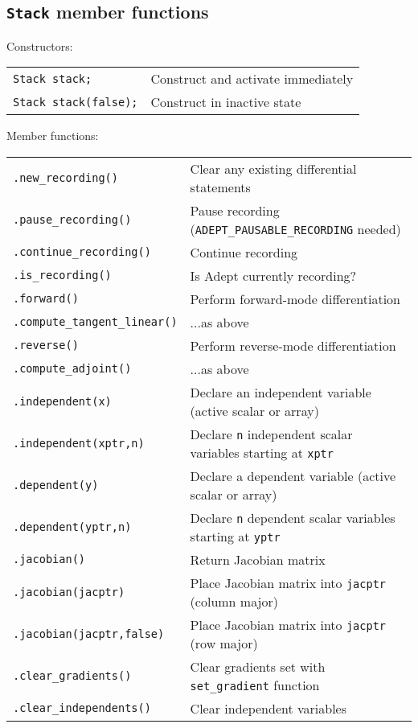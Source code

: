 \documentclass[10pt,a4,landscape]{article}
\def\code#1{\texttt{#1}}
\begin{document}
\subsection*{\code{Stack} member functions}
Constructors:\\
\begin{tabular}{ll}
\code{Stack stack;} & Construct and activate immediately \\
\code{Stack stack(false);} & Construct in inactive state\\
\end{tabular}

Member functions:\\
\begin{tabular}{ll}
\code{.new\_recording()} & Clear any existing differential statements\\
\code{.pause\_recording()} & Pause recording (\code{ADEPT\_PAUSABLE\_RECORDING} needed)\\
\code{.continue\_recording()} & Continue recording \\
\code{.is\_recording()} & Is Adept currently recording?\\
\code{.forward()} & Perform forward-mode differentiation\\
\code{.compute\_tangent\_linear()} & ...as above\\
\code{.reverse()} & Perform reverse-mode differentiation\\
\code{.compute\_adjoint()} & ...as above\\
\code{.independent(x)} & Declare an independent variable (active scalar or array)\\
\code{.independent(xptr,n)} & Declare \code{n} independent scalar variables starting at \code{xptr} \\
\code{.dependent(y)} & Declare a dependent variable (active scalar or array)\\
\code{.dependent(yptr,n)} & Declare \code{n} dependent scalar variables starting at \code{yptr}\\
\code{.jacobian()} & Return Jacobian matrix\\
\code{.jacobian(jacptr)} & Place Jacobian matrix into \code{jacptr} (column major)\\
\code{.jacobian(jacptr,false)} & Place Jacobian matrix into \code{jacptr} (row major)\\
\code{.clear\_gradients()} & Clear gradients set with \code{set\_gradient} function \\
\code{.clear\_independents()} & Clear independent variables\\

\end{tabular}
\end{document}
